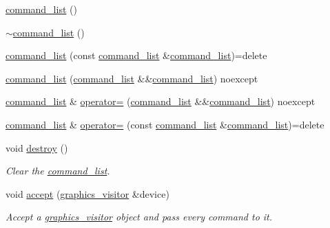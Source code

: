 \begin{DoxyCompactItemize}
\item 
\mbox{\hyperlink{classmoka_1_1command__list_af4eee376414e5faef7e447035a382317}{command\+\_\+list}} ()
\item 
\mbox{\hyperlink{classmoka_1_1command__list_a46f6b65b0777d2268753d2b6573e6bcd}{$\sim$command\+\_\+list}} ()
\item 
\mbox{\hyperlink{classmoka_1_1command__list_af404b77f90b76b65d85c2993a8535dbf}{command\+\_\+list}} (const \mbox{\hyperlink{classmoka_1_1command__list}{command\+\_\+list}} \&\mbox{\hyperlink{classmoka_1_1command__list}{command\+\_\+list}})=delete
\item 
\mbox{\hyperlink{classmoka_1_1command__list_a1a4954327653483fdd95b507c6df67a2}{command\+\_\+list}} (\mbox{\hyperlink{classmoka_1_1command__list}{command\+\_\+list}} \&\&\mbox{\hyperlink{classmoka_1_1command__list}{command\+\_\+list}}) noexcept
\item 
\mbox{\hyperlink{classmoka_1_1command__list}{command\+\_\+list}} \& \mbox{\hyperlink{classmoka_1_1command__list_a0ac12e3c124d04ca19cdabef228e5d25}{operator=}} (\mbox{\hyperlink{classmoka_1_1command__list}{command\+\_\+list}} \&\&\mbox{\hyperlink{classmoka_1_1command__list}{command\+\_\+list}}) noexcept
\item 
\mbox{\hyperlink{classmoka_1_1command__list}{command\+\_\+list}} \& \mbox{\hyperlink{classmoka_1_1command__list_a9199b2f5a07d8fc13d30712c557771c5}{operator=}} (const \mbox{\hyperlink{classmoka_1_1command__list}{command\+\_\+list}} \&\mbox{\hyperlink{classmoka_1_1command__list}{command\+\_\+list}})=delete
\item 
void \mbox{\hyperlink{classmoka_1_1command__list_a297ff73bb17ff2a47e842176cf6e9be2}{destroy}} ()
\begin{DoxyCompactList}\small\item\em Clear the \mbox{\hyperlink{classmoka_1_1command__list}{command\+\_\+list}}. \end{DoxyCompactList}\item 
void \mbox{\hyperlink{classmoka_1_1command__list_a4f0eec40ea95594a8558b4335a7de4a9}{accept}} (\mbox{\hyperlink{classmoka_1_1graphics__visitor}{graphics\+\_\+visitor}} \&device)
\begin{DoxyCompactList}\small\item\em Accept a \mbox{\hyperlink{classmoka_1_1graphics__visitor}{graphics\+\_\+visitor}} object and pass every command to it. \end{DoxyCompactList}\item 

\end{DoxyCompactItemize}
